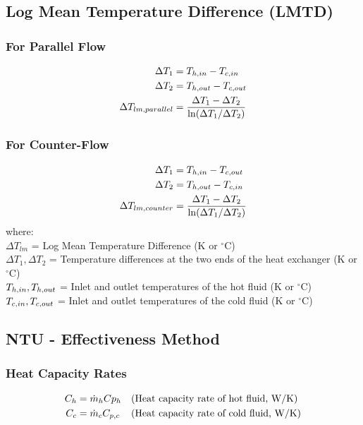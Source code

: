 \subsection{Log Mean Temperature Difference (LMTD)}
\subsubsection*{For Parallel Flow}
\begin{align}
    \Delta T_1 &= T_{h,in} - T_{c,in} \\
    \Delta T_2 &= T_{h,out} - T_{c,out} \\
    \Delta T_{lm,parallel} &= \frac{\Delta T_1 - \Delta T_2}{\ln(\Delta T_1 / \Delta T_2)}
\end{align}

\subsubsection*{For Counter-Flow}
\begin{align}
    \Delta T_1 &= T_{h,in} - T_{c,out} \\
    \Delta T_2 &= T_{h,out} - T_{c,in} \\
    \Delta T_{lm,counter} &= \frac{\Delta T_1 - \Delta T_2}{\ln(\Delta T_1 / \Delta T_2)}
\end{align}
where: \\
$\Delta T_{lm}$ = Log Mean Temperature Difference (K or $^\circ$C) \\
$\Delta T_1, \Delta T_2$ = Temperature differences at the two ends of the heat exchanger (K or $^\circ$C) \\
$T_{h,in}, T_{h,out}$ = Inlet and outlet temperatures of the hot fluid (K or $^\circ$C) \\
$T_{c,in}, T_{c,out}$ = Inlet and outlet temperatures of the cold fluid (K or $^\circ$C)

\subsection{NTU - Effectiveness Method}
\subsubsection*{Heat Capacity Rates}

\begin{align}
    C_h &= \dot{m}_h Cp_{h} && \text{(Heat capacity rate of hot fluid, W/K)} \\
    C_c &= \dot{m}_c C_{p,c} && \text{(Heat capacity rate of cold fluid, W/K)}
\end{align}

